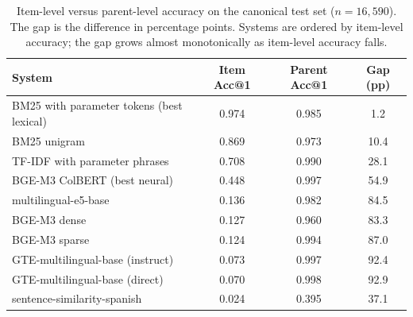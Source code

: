 \begin{table}[ht]
\centering
\caption{Item-level versus parent-level accuracy on the canonical test set ($n=16{,}590$). The gap is the difference in percentage points. Systems are ordered by item-level accuracy; the gap grows almost monotonically as item-level accuracy falls.}
\label{tab:dissociation}
\begin{tabular}{lccc}
\toprule
\textbf{System} & \textbf{Item Acc@1} & \textbf{Parent Acc@1} & \textbf{Gap (pp)} \\
\midrule
BM25 with parameter tokens (best lexical) & 0.974 & 0.985 & 1.2 \\
BM25 unigram & 0.869 & 0.973 & 10.4 \\
TF-IDF with parameter phrases & 0.708 & 0.990 & 28.1 \\
BGE-M3 ColBERT (best neural) & 0.448 & 0.997 & 54.9 \\
multilingual-e5-base & 0.136 & 0.982 & 84.5 \\
BGE-M3 dense & 0.127 & 0.960 & 83.3 \\
BGE-M3 sparse & 0.124 & 0.994 & 87.0 \\
GTE-multilingual-base (instruct) & 0.073 & 0.997 & 92.4 \\
GTE-multilingual-base (direct) & 0.070 & 0.998 & 92.9 \\
sentence-similarity-spanish & 0.024 & 0.395 & 37.1 \\
\bottomrule
\end{tabular}
\end{table}
